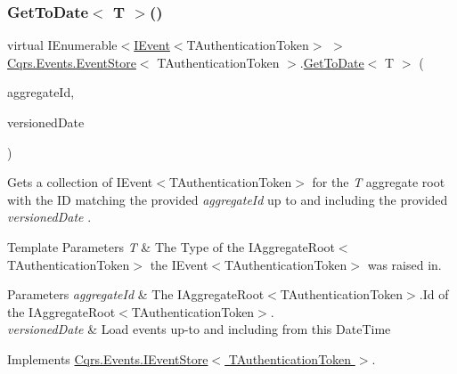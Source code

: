 \subsubsection{\texorpdfstring{Get\+To\+Date$<$ T $>$()}{GetToDate< T >()}}
{\footnotesize\ttfamily virtual I\+Enumerable$<$\hyperlink{interfaceCqrs_1_1Events_1_1IEvent}{I\+Event}$<$T\+Authentication\+Token$>$ $>$ \hyperlink{classCqrs_1_1Events_1_1EventStore}{Cqrs.\+Events.\+Event\+Store}$<$ T\+Authentication\+Token $>$.\hyperlink{classCqrs_1_1Events_1_1EventStore_acc2cf147ad6420c5359485f04367d5d1_acc2cf147ad6420c5359485f04367d5d1}{Get\+To\+Date}$<$ T $>$ (\begin{DoxyParamCaption}\item[{Guid}]{aggregate\+Id,  }\item[{Date\+Time}]{versioned\+Date }\end{DoxyParamCaption})\hspace{0.3cm}{\ttfamily [virtual]}}



Gets a collection of I\+Event$<$\+T\+Authentication\+Token$>$ for the {\itshape T} aggregate root with the ID matching the provided {\itshape aggregate\+Id}  up to and including the provided {\itshape versioned\+Date} . 


\begin{DoxyTemplParams}{Template Parameters}
{\em T} & The Type of the I\+Aggregate\+Root$<$\+T\+Authentication\+Token$>$ the I\+Event$<$\+T\+Authentication\+Token$>$ was raised in.\\
\hline
\end{DoxyTemplParams}

\begin{DoxyParams}{Parameters}
{\em aggregate\+Id} & The I\+Aggregate\+Root$<$\+T\+Authentication\+Token$>$.\+Id of the I\+Aggregate\+Root$<$\+T\+Authentication\+Token$>$.\\
\hline
{\em versioned\+Date} & Load events up-\/to and including from this Date\+Time\\
\hline
\end{DoxyParams}


Implements \hyperlink{interfaceCqrs_1_1Events_1_1IEventStore_ae0d3304dcab1e6c94eb51b3a0eb645cd_ae0d3304dcab1e6c94eb51b3a0eb645cd}{Cqrs.\+Events.\+I\+Event\+Store$<$ T\+Authentication\+Token $>$}.

\mbox{\label{classCqrs_1_1Events_1_1EventStore_a2785f85c9d986cdf11ab6054826c195d_a2785f85c9d986cdf11ab6054826c195d}} 
